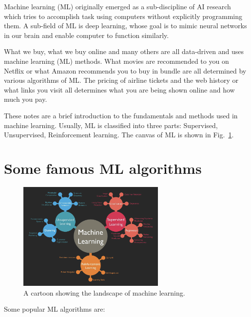 \documentclass[11pt]{article}
\begin{document}
	
	Machine learning (ML) originally emerged as a sub-discipline of AI research which tries to accomplish task 
	using computers without explicitly programming them. A sub-field of ML is deep learning, whose goal is to mimic
	neural networks in our brain and enable computer to function similarly. 
	
	
	What we buy, what we buy online and many others
	are all data-driven and uses machine learning (ML) methods. What movies are recommended to you on Netflix or what Amazon
	recommends you to buy in bundle are all determined by various algorithms of ML. The pricing of airline tickets and the web history 
	or what links you visit all determines what you are being shown online and how much you pay. 
	
	These notes are a brief introduction to the fundamentals and methods used in machine learning. Usually, ML is 
	classified into three parts: Supervised, Unsupervised, Reinforcement learning. The canvas of ML is shown in Fig.~\ref{fig:EXP}. 
	
	
	
	
	\newpage
	\section{Some famous ML algorithms}
	
	
	

\begin{figure}
\centering 
\includegraphics[width=0.65\textwidth]{cartoonML.png}
\caption{\label{fig:EXP}A cartoon showing the landscape of machine learning.}
\end{figure}
	
	
Some popular ML algorithms are: 
\end{document}
